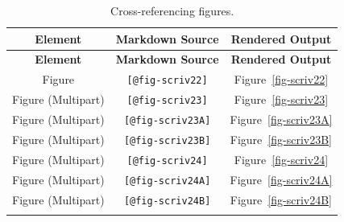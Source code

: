 \documentclass[
  12pt,
  a4paper,
  oneside,
  numbers=noenddot,
  titlepage,
  toclink=all,
  toc=bibliography]{scrbook}
\theoremstyle{definition}
\theoremstyle{definition}
\theoremstyle{definition}
\theoremstyle{plain}
\theoremstyle{plain}
\theoremstyle{plain}
\theoremstyle{plain}
\theoremstyle{plain}
\theoremstyle{remark}
\begin{document}
\hypertarget{tbl-scriv21}{}
\begin{longtable}[]{@{}ccc@{}}
\toprule\noalign{}
\textbf{Element} & \textbf{Markdown Source} & \textbf{Rendered
Output} \\
\midrule\noalign{}
\endfirsthead
\toprule\noalign{}
\textbf{Element} & \textbf{Markdown Source} & \textbf{Rendered
Output} \\
\midrule\noalign{}
\endhead
\bottomrule\noalign{}
\endlastfoot
Figure & \texttt{{[}@fig-scriv22{]}} &
\protect\hypertarget{cite_73}{}{\label{cite_73}Figure~\ref{fig-scriv22}} \\
Figure (Multipart) & \texttt{{[}@fig-scriv23{]}} &
\protect\hypertarget{cite_74}{}{\label{cite_74}Figure~\ref{fig-scriv23}} \\
Figure (Multipart) & \texttt{{[}@fig-scriv23A{]}} &
\protect\hypertarget{cite_75}{}{\label{cite_75}Figure~\ref{fig-scriv23A}} \\
Figure (Multipart) & \texttt{{[}@fig-scriv23B{]}} &
\protect\hypertarget{cite_76}{}{\label{cite_76}Figure~\ref{fig-scriv23B}} \\
Figure (Multipart) & \texttt{{[}@fig-scriv24{]}} &
\protect\hypertarget{cite_77}{}{\label{cite_77}Figure~\ref{fig-scriv24}} \\
Figure (Multipart) & \texttt{{[}@fig-scriv24A{]}} &
\protect\hypertarget{cite_78}{}{\label{cite_78}Figure~\ref{fig-scriv24A}} \\
Figure (Multipart) & \texttt{{[}@fig-scriv24B{]}} &
\protect\hypertarget{cite_79}{}{\label{cite_79}Figure~\ref{fig-scriv24B}} \\
\caption{\label{tbl-scriv21}Cross-referencing figures.}\tabularnewline
\end{longtable}
\end{document}
